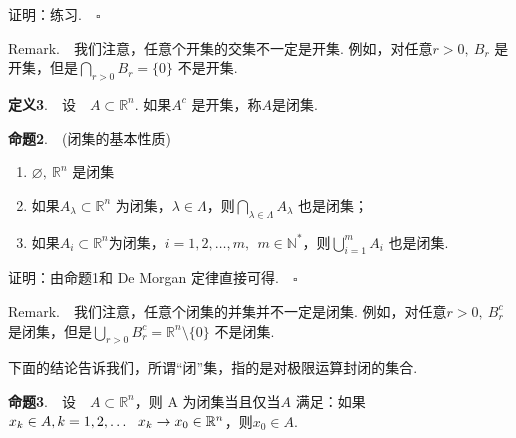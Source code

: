 \documentclass{article}
\begin{document}
\vspace{10pt}

\noindent 证明：练习.\(\quad \square\)

\vspace{20pt}

\noindent Remark.\ \ 我们注意，任意个开集的交集不一定是开集. 例如，对任意\newline\(r > 0,\ B_r\) 是开集，但是\(\displaystyle\bigcap_{r > 0}B_r = \{0\} \) 不是开集.

\newpage

\noindent \textbf{定义3}.\ \ 设\ \ \(A \subset \mathbb{R}^n\). 如果\(A^{c}\) 是开集，称\(A\)是闭集.


\vspace{20pt}

\noindent \textbf{命题2}.\ \ (闭集的基本性质)
\begin{enumerate}
    \item \(\varnothing,\ \mathbb{R}^n\) 是闭集
    \item 如果\(A_{\lambda }\subset \mathbb{R}^n\) 为闭集，\(\lambda \in \Lambda \)，则\(\displaystyle\bigcap_{\lambda \in \Lambda }A_{\lambda }\) 也是闭集；
    \item 如果\(A_i \subset \mathbb{R}^n\)为闭集，\(i = 1,2,\dots ,m,\ \ m \in \mathbb{N}^{*}\)，则\(\displaystyle\bigcup_{i = 1}^{m}A_{i}\) 也是闭集.
\end{enumerate}

\vspace{10pt}

\noindent 证明：由命题1和 De Morgan 定律直接可得.\(\quad \square\)

\vspace{20pt}

\noindent Remark.\ \ 我们注意，任意个闭集的并集并不一定是闭集. 例如，对任意\(r > 0,\ B_r^{c}\) 是闭集，但是\(\displaystyle\bigcup_{r > 0}B_r^{c} = \mathbb{R}^n\setminus \{0\}\) 不是闭集.

\newpage

\noindent 下面的结论告诉我们，所谓“闭”集，指的是对极限运算封闭的集合.

\vspace{20pt}

\noindent \textbf{命题3}.\ \ 设\ \ \(A \subset \mathbb{R}^n\)，则 A 为闭集当且仅当\(A\) 满足：如果\ \ \(x_k \in A,\newline k = 1,2,\dots \ \  x_k \to x_0 \in \mathbb{R}^n\)，则\(x_0 \in A\).

\vspace{20pt}
\end{document}
